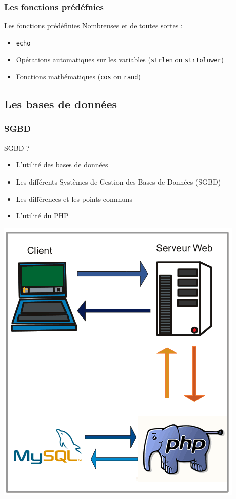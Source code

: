 \documentclass[handout]{beamer}
\begin{document}
\begin{frame}
	\frametitle{Les fonctions prédéfnies}
	\begin{block}{Les fonctions prédéfinies}
		Nombreuses et de toutes sortes :
		\begin{itemize}
			\item \texttt{echo}
			\item Opérations automatiques sur les variables (\texttt{strlen} ou \texttt{strtolower})
			\item Fonctions mathématiques (\texttt{cos} ou \texttt{rand})
		\end{itemize}
	\end{block}

\end{frame}

\subsection{Les bases de données}
\begin{frame}
	\frametitle{SGBD}

	\begin{block}{SGBD ?}
		\begin{itemize}
			\item L'utilité des bases de données
			\item Les différents Systèmes de Gestion des Bases de Données (SGBD)
			\item Les différences et les points communs
			\item L'utilité du PHP
		\end{itemize}
	\end{block}
\end{frame}

\begin{frame}
	\begin{center}
	\includegraphics[scale=0.4]{../schema2.png}
	\end{center}
\end{frame}
\end{document}
